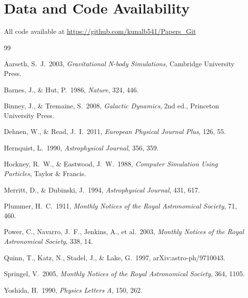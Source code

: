 \documentclass[11pt,a4paper]{article}
\begin{document}
\section*{Data and Code Availability}

All code available at \url{https://github.com/kunalb541/Papers_Git}

\clearpage

\begin{thebibliography}{99}

Aarseth, S.~J.\ 2003, \textit{Gravitational N-body Simulations},
Cambridge University Press.

Barnes, J., \& Hut, P.\ 1986, \textit{Nature}, 324, 446.

Binney, J., \& Tremaine, S.\ 2008, \textit{Galactic Dynamics}, 2nd ed.,
Princeton University Press.

Dehnen, W., \& Read, J.~I.\ 2011,
\textit{European Physical Journal Plus}, 126, 55.

Hernquist, L.\ 1990, \textit{Astrophysical Journal}, 356, 359.

Hockney, R.~W., \& Eastwood, J.~W.\ 1988,
\textit{Computer Simulation Using Particles}, Taylor \& Francis.

Merritt, D., \& Dubinski, J.\ 1994,
\textit{Astrophysical Journal}, 431, 617.

Plummer, H.~C.\ 1911,
\textit{Monthly Notices of the Royal Astronomical Society}, 71, 460.

Power, C., Navarro, J.~F., Jenkins, A., et al.\ 2003,
\textit{Monthly Notices of the Royal Astronomical Society}, 338, 14.

Quinn, T., Katz, N., Stadel, J., \& Lake, G.\ 1997,
arXiv:astro-ph/9710043.

Springel, V.\ 2005,
\textit{Monthly Notices of the Royal Astronomical Society}, 364, 1105.

Yoshida, H.\ 1990, \textit{Physics Letters A}, 150, 262.

\end{thebibliography}
\end{document}
